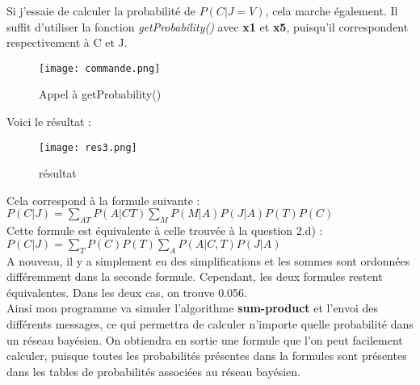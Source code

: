 \documentclass[12pt]{article}
\begin{document}
Si j'essaie de calculer la probabilité de $P(C|J=V)$, cela marche également. 
Il suffit d'utiliser la fonction \textit{getProbability()} avec \textbf{x1} et \textbf{x5}, puisqu'il correspondent respectivement à C et J.
\begin{figure}[H]
\begin{center}
  \texttt{[image: commande.png]}
  \caption{Appel à getProbability()}
\end{center}
\end{figure}
Voici le résultat : 
\begin{figure}[H]
\begin{center}
  \texttt{[image: res3.png]}
  \caption{résultat}
\end{center}
\end{figure}
Cela correspond à la formule suivante : \\ 
$P(C|J) = \sum_{A T} P(A|C T) \sum_{M} P(M|A) P(J|A) P(T) P(C) $ \\
Cette formule est équivalente à celle trouvée à la question 2.d) : \\
$P(C|J) = \sum_{T} P(C) P(T) \sum_{A} P(A|C, T) P(J|A)$ \\
A nouveau, il y a simplement eu des simplifications et les sommes sont ordonnées différemment dans la seconde formule. Cependant, les deux formules restent équivalentes. Dans les deux cas, on trouve 0.056.
\\ \linebreak
Ainsi mon programme va simuler l'algorithme \textbf{sum-product} et l'envoi des différents messages, ce qui permettra de calculer n'importe quelle probabilité dans un réseau bayésien. On obtiendra en sortie une formule que l'on peut facilement calculer, puisque toutes les probabilités présentes dans la formules sont présentes dans les tables de probabilités associées au réseau bayésien.
\end{document}
